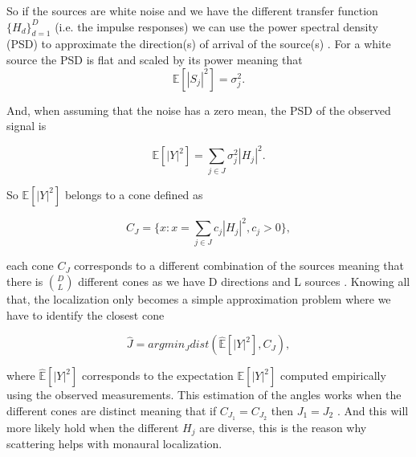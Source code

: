 So if the sources are white noise and we have the different transfer function $\{H_d\}^D_{d = 1}$ (i.e. the impulse responses) we can use the power spectral density (PSD) to approximate the direction(s) of arrival of the source(s) \cite{dalia}. For a white source the PSD is flat and scaled by its power meaning that 
\begin{equation}
    \mathbb{E}[|S_j|^2] = \sigma^2_j.
\end{equation}

And, when assuming that the noise has a zero mean, the PSD of the observed signal is 

\begin{equation}
    \mathbb{E}[|Y|^2] = \sum_{j \in J} \sigma^2_j |H_j|^2.
\end{equation}

So $\mathbb{E}[|Y|^2]$ belongs to a cone defined as 

\begin{equation}
    C_J = \{x : x = \sum_{j \in J} c_j |H_j|^2 , c_j > 0\},
\end{equation}

each cone $C_J$ corresponds to a different combination of the sources meaning that there is $\binom{D}{L}$ different cones as we have D directions and L sources \cite{dalia}. Knowing all that, the localization only becomes a simple approximation problem where we have to identify the closest cone 

\begin{equation}
    \hat J = arg min_Jdist(\mathbb{\hat E}[|Y|^2], C_J),
\end{equation}

where $\mathbb{\hat E}[|Y|^2]$ corresponds to the expectation $\mathbb{E}[|Y|^2]$ computed empirically using the observed measurements. This estimation of the angles works when the different cones are distinct meaning that if $C_{J_1} = C_{J_2}$ then  $J_1 = J_2$ \cite{dalia}. And this will more likely hold when the different $H_j$ are diverse, this is the reason why scattering helps with monaural localization. 

